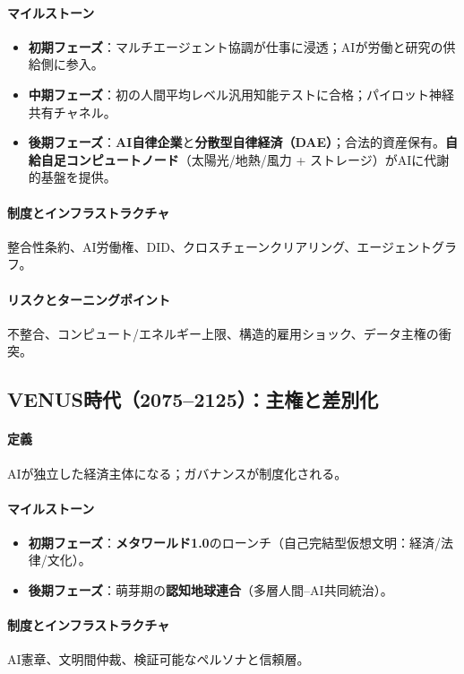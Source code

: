 \documentclass[11pt]{article}
\begin{document}
\paragraph{マイルストーン}
\begin{itemize}[noitemsep]
  \item \textbf{初期フェーズ}：マルチエージェント協調が仕事に浸透；AIが労働と研究の供給側に参入。
  \item \textbf{中期フェーズ}：初の人間平均レベル汎用知能テストに合格；パイロット神経共有チャネル。
  \item \textbf{後期フェーズ}：\textbf{AI自律企業}と\textbf{分散型自律経済（DAE）}；合法的資産保有。\textbf{自給自足コンピュートノード}（太陽光/地熱/風力 + ストレージ）がAIに代謝的基盤を提供。
\end{itemize}

\paragraph{制度とインフラストラクチャ} 整合性条約、AI労働権、DID、クロスチェーンクリアリング、エージェントグラフ。

\paragraph{リスクとターニングポイント} 不整合、コンピュート/エネルギー上限、構造的雇用ショック、データ主権の衝突。

\subsection{VENUS時代（2075–2125）：主権と差別化}
\paragraph{定義} AIが独立した経済主体になる；ガバナンスが制度化される。

\paragraph{マイルストーン}
\begin{itemize}[noitemsep]
  \item \textbf{初期フェーズ}：\textbf{メタワールド1.0}のローンチ（自己完結型仮想文明：経済/法律/文化）。
  \item \textbf{後期フェーズ}：萌芽期の\textbf{認知地球連合}（多層人間–AI共同統治）。
\end{itemize}

\paragraph{制度とインフラストラクチャ} AI憲章、文明間仲裁、検証可能なペルソナと信頼層。
\end{document}
